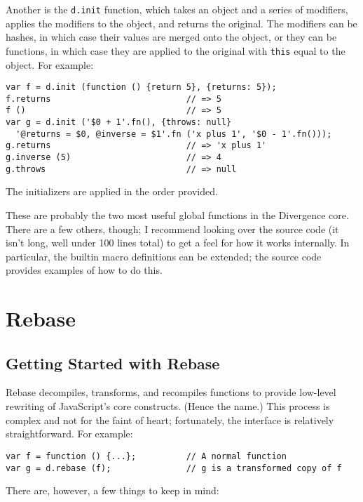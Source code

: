 \documentclass{report}
\begin{document}
    Another is the \verb|d.init| function, which takes an object and a series of modifiers, applies the modifiers to the object, and returns the original. The modifiers can be hashes, in which
    case their values are merged onto the object, or they can be functions, in which case they are applied to the original with \verb|this| equal to the object. For example:

\begin{verbatim}
var f = d.init (function () {return 5}, {returns: 5});
f.returns                           // => 5
f ()                                // => 5
var g = d.init ('$0 + 1'.fn(), {throws: null}
  '@returns = $0, @inverse = $1'.fn ('x plus 1', '$0 - 1'.fn()));
g.returns                           // => 'x plus 1'
g.inverse (5)                       // => 4
g.throws                            // => null
\end{verbatim}

    The initializers are applied in the order provided.

    These are probably the two most useful global functions in the Divergence core. There are a few others, though; I recommend looking over the source code (it isn't long, well under 100
    lines total) to get a feel for how it works internally. In particular, the builtin macro definitions can be extended; the source code provides examples of how to do this.

\part {Rebase}
\chapter {Getting Started with Rebase}
    Rebase decompiles, transforms, and recompiles functions to provide low-level rewriting of JavaScript's core constructs. (Hence the name.) This process is complex and not for the faint of
    heart; fortunately, the interface is relatively straightforward. For example:

\begin{verbatim}
var f = function () {...};          // A normal function
var g = d.rebase (f);               // g is a transformed copy of f
\end{verbatim}

    There are, however, a few things to keep in mind:
\end{document}

